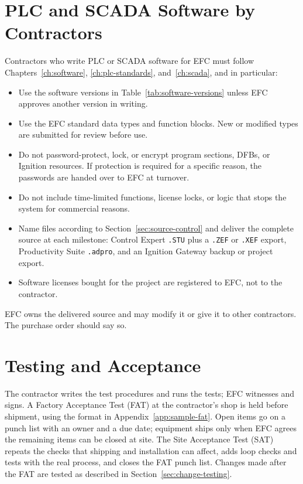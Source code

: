 \section[PLC and SCADA Software by Contractors]{PLC and SCADA Software by Contractors \newmark}\label{sec:contractor-software}
Contractors who write PLC or SCADA software for EFC must follow Chapters~\ref{ch:software}, \ref{ch:plc-standards}, and~\ref{ch:scada}, and in particular:
\begin{itemize}[itemsep=1pt]
  \item Use the software versions in Table~\ref{tab:software-versions} unless EFC approves another version in writing.
  \item Use the EFC standard data types and function blocks. New or modified types are submitted for review before use.
  \item Do not password-protect, lock, or encrypt program sections, DFBs, or Ignition resources. If protection is required for a specific reason, the passwords are handed over to EFC at turnover.
  \item Do not include time-limited functions, license locks, or logic that stops the system for commercial reasons.
  \item Name files according to Section~\ref{sec:source-control} and deliver the complete source at each milestone: Control Expert \texttt{.STU} plus a \texttt{.ZEF} or \texttt{.XEF} export, Productivity Suite \texttt{.adpro}, and an Ignition Gateway backup or project export.
  \item Software licenses bought for the project are registered to EFC, not to the contractor.
\end{itemize}
EFC owns the delivered source and may modify it or give it to other contractors. The purchase order should say so.

\section[Testing and Acceptance]{Testing and Acceptance \newmark}\label{sec:contractor-testing}
The contractor writes the test procedures and runs the tests; EFC witnesses and signs. A Factory Acceptance Test (FAT) at the contractor's shop is held before shipment, using the format in Appendix~\ref{app:sample-fat}. Open items go on a punch list with an owner and a due date; equipment ships only when EFC agrees the remaining items can be closed at site. The Site Acceptance Test (SAT) repeats the checks that shipping and installation can affect, adds loop checks and tests with the real process, and closes the FAT punch list. Changes made after the FAT are tested as described in Section~\ref{sec:change-testing}.

